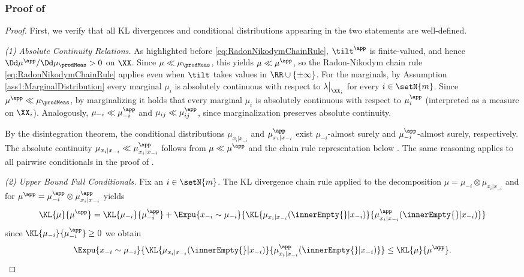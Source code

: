 \documentclass{article}
\begin{document}
\subsubsection{Proof of }
\label{thm:JointVsFullConditionals-PROOF}
\begin{proof}
 First, we verify that all KL divergences and conditional distributions
 appearing in the two statements are well-defined.

 \emph{(1) Absolute Continuity Relations.} As highlighted before
  \eqref{eq:RadonNikodymChainRule}, $\tilt^\app$ is finite-valued, and hence
  $\Dd\mu^\app/\Dd\mu_\prodMeas>0$ on $\XX$. Since
  $\mu\ll\mu_\prodMeas$, this yields $\mu\ll\mu^\app$, so the
  Radon-Nikodym chain rule \eqref{eq:RadonNikodymChainRule} applies even when
  $\tilt$ takes values in $\RR\cup\{\pm\infty\}$. For the marginals, by
 Assumption \ref{ass1:MarginalDistribution} every marginal
 $\mu_i$ is absolutely continuous with respect to $\lambda\big\vert_{\XX_i}$ for
 every $i \in \setN{m}$. Since $\mu^\app \ll \mu_\prodMeas$, by marginalizing
 it holds that every marginal $\mu_i$ is absolutely continuous with respect to $\mu_i^\app$
 (interpreted as a measure on $\XX_i$). Analogously, $\mu_{-i} \ll \mu_{-i}^\app$
 and $\mu_{ij} \ll \mu_{ij}^\app$, since marginalization preserves absolute continuity.

 By the disintegration theorem, the conditional distributions $\mu_{x_i\vert
   x_{-i}}$ and $\mu^\app_{x_i\vert x_{-i}}$ exist $\mu_{-i}$-almost surely
 and $\mu_{-i}^\app$-almost surely, respectively. The absolute continuity
 $\mu_{x_i\vert x_{-i}} \ll \mu^\app_{x_i\vert x_{-i}}$ follows from $\mu
  \ll \mu^\app$ and the chain rule representation below \cite[Thm.
  2.5.3]{coverELEMENTSINFORMATIONTHEORY}. The same reasoning applies to all
 pairwise conditionals in the proof of
 .

 \emph{(2) Upper Bound Full Conditionals.} Fix an $i\in \setN{m}$. The KL divergence chain
 rule \cite[Thm. 2.5.3]{coverELEMENTSINFORMATIONTHEORY} applied to the
 decomposition $\mu = \mu_{-i} \otimes \mu_{x_i \vert x_{-i}}$ and for
 $\mu^\app = \mu^\app_{-i} \otimes \mu^\app_{x_i\vert x_{-i}}$ yields
 \begin{align}
  \KL{\mu}{\mu^\app} = \KL{\mu_{-i}}{\mu^\app_{-i}}
  + \Expu{x_{-i}\sim \mu_{-i}}{
   \KL{\mu_{x_i\vert x_{-i}}(\innerEmpty{}\vert x_{-i})}{
    \mu^\app_{x_i\vert x_{-i}}(\innerEmpty{}\vert x_{-i})
   }
  }
  \label{eq:JointGeCondFullCondDecomposition}
 \end{align}
 since $\KL{\mu_{-i}}{\mu^\app_{-i}} \geq 0$ we obtain
 \begin{align*}
  \Expu{x_{-i}\sim \mu_{-i}}{
   \KL{\mu_{x_i\vert x_{-i}}(\innerEmpty{}\vert x_{-i})}{
    \mu^\app_{x_i\vert x_{-i}}(\innerEmpty{}\vert x_{-i})
   }
  } \leq \KL{\mu}{\mu^\app}.
 \end{align*}
\end{proof}
\end{document}
